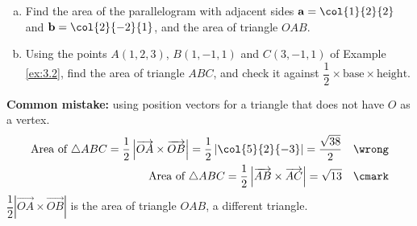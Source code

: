 \begin{example}[label=ex:3.4]
\begin{enumerate}[(a)]
  \item Find the area of the parallelogram with adjacent sides $\mathbf{a} = \col{1}{2}{2}$ and $\mathbf{b} = \col{2}{-2}{1}$, and the area of triangle $OAB$.
  \item Using the points $A(1,2,3)$, $B(1,-1,1)$ and $C(3,-1,1)$ of Example \ref{ex:3.2}, find the area of triangle $ABC$, and check it against $\dfrac{1}{2}\times\text{base}\times\text{height}$.
\end{enumerate}
\end{example}



\begin{mistake}
\textbf{Common mistake:} using position vectors for a triangle that does not have $O$ as a vertex.
\begin{align*}
\text{Area of }\triangle ABC = \dfrac{1}{2}\left|\overrightarrow{OA}\times\overrightarrow{OB}\right| = \dfrac{1}{2}\left|\col{5}{2}{-3}\right| = \dfrac{\sqrt{38}}{2} & & \wrong \\
\text{Area of }\triangle ABC = \dfrac{1}{2}\left|\overrightarrow{AB}\times\overrightarrow{AC}\right| = \sqrt{13} & & \cmark
\end{align*}
$\dfrac{1}{2}|\overrightarrow{OA}\times\overrightarrow{OB}|$ is the area of triangle $OAB$, a different triangle.
\end{mistake}
